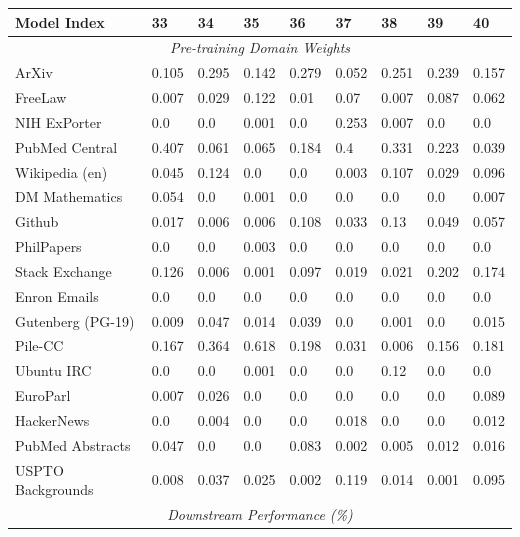 \documentclass{article}
\theoremstyle{definition}
\theoremstyle{remark}
\begin{document}
\begin{table}[!ht]
    \centering
    \begin{tabular}{lllllllll}
    \toprule
        \textbf{Model Index} & \textbf{33} & \textbf{34} & \textbf{35} & \textbf{36} & \textbf{37} & \textbf{38} & \textbf{39} & \textbf{40} \\ \midrule
        \multicolumn{9}{c}{\textit{Pre-training Domain Weights}} \\
        ArXiv & 0.105 & 0.295 & 0.142 & 0.279 & 0.052 & 0.251 & 0.239 & 0.157 \\ 
        FreeLaw & 0.007 & 0.029 & 0.122 & 0.01 & 0.07 & 0.007 & 0.087 & 0.062 \\ 
        NIH ExPorter & 0.0 & 0.0 & 0.001 & 0.0 & 0.253 & 0.007 & 0.0 & 0.0 \\ 
        PubMed Central & 0.407 & 0.061 & 0.065 & 0.184 & 0.4 & 0.331 & 0.223 & 0.039 \\ 
        Wikipedia (en) & 0.045 & 0.124 & 0.0 & 0.0 & 0.003 & 0.107 & 0.029 & 0.096 \\ 
        DM Mathematics & 0.054 & 0.0 & 0.001 & 0.0 & 0.0 & 0.0 & 0.0 & 0.007 \\ 
        Github & 0.017 & 0.006 & 0.006 & 0.108 & 0.033 & 0.13 & 0.049 & 0.057 \\ 
        PhilPapers & 0.0 & 0.0 & 0.003 & 0.0 & 0.0 & 0.0 & 0.0 & 0.0 \\ 
        Stack Exchange & 0.126 & 0.006 & 0.001 & 0.097 & 0.019 & 0.021 & 0.202 & 0.174 \\ 
        Enron Emails & 0.0 & 0.0 & 0.0 & 0.0 & 0.0 & 0.0 & 0.0 & 0.0 \\ 
        Gutenberg (PG-19) & 0.009 & 0.047 & 0.014 & 0.039 & 0.0 & 0.001 & 0.0 & 0.015 \\ 
        Pile-CC & 0.167 & 0.364 & 0.618 & 0.198 & 0.031 & 0.006 & 0.156 & 0.181 \\ 
        Ubuntu IRC & 0.0 & 0.0 & 0.001 & 0.0 & 0.0 & 0.12 & 0.0 & 0.0 \\ 
        EuroParl & 0.007 & 0.026 & 0.0 & 0.0 & 0.0 & 0.0 & 0.0 & 0.089 \\ 
        HackerNews & 0.0 & 0.004 & 0.0 & 0.0 & 0.018 & 0.0 & 0.0 & 0.012 \\ 
        PubMed Abstracts & 0.047 & 0.0 & 0.0 & 0.083 & 0.002 & 0.005 & 0.012 & 0.016 \\ 
        USPTO Backgrounds & 0.008 & 0.037 & 0.025 & 0.002 & 0.119 & 0.014 & 0.001 & 0.095 \\ 
        \midrule
        \multicolumn{9}{c}{\textit{Downstream Performance (\%)}} \\

\end{tabular}
\end{table}
\end{document}
